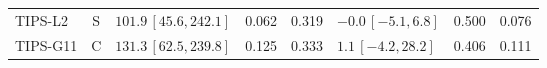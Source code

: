 \begin{longtable}{lcp{37mm}rrp{37mm}rr}
TIPS-L2 & S & \(101.9\,[45.6,242.1]\) & 0.062 & 0.319 & \(-0.0\,[-5.1,6.8]\) & 0.500 & 0.076\\
TIPS-G11 & C & \(131.3\,[62.5,239.8]\) & 0.125 & 0.333 & \(1.1\,[-4.2,28.2]\) & 0.406 & 0.111\\

\end{longtable}
